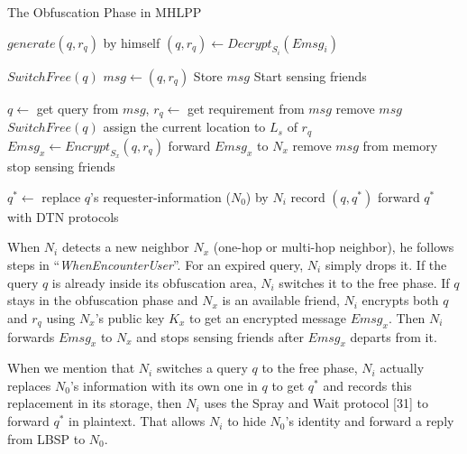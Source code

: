 \begin{algorithm}
\caption{The Obfuscation Phase in MHLPP}\label{AlgObfMhlpp}
\begin{algorithmic}[1]
	\State $generate\left (q,r_q\right)$ by himself
\Else 
		\State $\left (q,r_q\right) \gets {Decrypt}_{S_i}\left({Emsg}_i\right)$
	\EndIf
\EndIf

	\State $SwitchFree\left(q\right)$
\Else 
	\State $msg \gets \left (q,r_q\right)$
	\State Store $msg$
	\State Start sensing friends
\EndIf
\EndProcedure

\State $q \gets$ get query from $msg$, $r_q \gets$ get requirement from $msg$
	\State remove $msg$
	\Return
\EndIf
{}
	\State $SwitchFree\left(q\right)$
	\Return
\EndIf
{}
		\State assign the current location to $L_s$ of $r_q$
	\EndIf
	\State ${Emsg}_x \gets {Encrypt}_{S_x}\left(q,r_q\right)$
	\State forward ${Emsg}_x$ to $N_x$
	\State remove $msg$ from memory
	\State stop sensing friends
\EndIf
\EndProcedure

\State ${q^*} \gets$ replace $q$'s requester-information ($N_0$) by $N_i$
\State record $\left(q,q^*\right)$
\State forward $q^*$ with DTN protocols
\EndProcedure
\end{algorithmic}
\end{algorithm}

When ${N}_{i}$ detects a new neighbor ${N}_{x}$ (one-hop or multi-hop neighbor), he follows steps in ``\textit{WhenEncounterUser}''. For an expired query, ${N}_{i}$ simply drops it. If the query $q$ is already inside its obfuscation area, ${N}_{i}$ switches it to the free phase. If $q$ stays in the obfuscation phase and ${N}_{x}$ is an available friend, ${N}_{i}$ encrypts both $q$ and $r_q$ using ${N}_{x}$'s public key ${K}_{x}$ to get an encrypted message ${Emsg}_{x}$. Then ${N}_{i}$ forwards ${Emsg}_{x}$ to ${N}_{x}$ and stops sensing friends after ${Emsg}_{x}$ departs from it.

When we mention that ${N}_{i}$ switches a query $q$ to the free phase, ${N}_{i}$ actually replaces $N_0$'s information with its own one in $q$ to get ${q}^{*}$ and records this replacement in its storage, then ${N}_{i}$ uses the Spray and Wait protocol [31] to forward ${q}^{*}$ in plaintext. That allows ${N}_{i}$ to hide $N_0$'s identity and forward a reply from LBSP to $N_0$.


